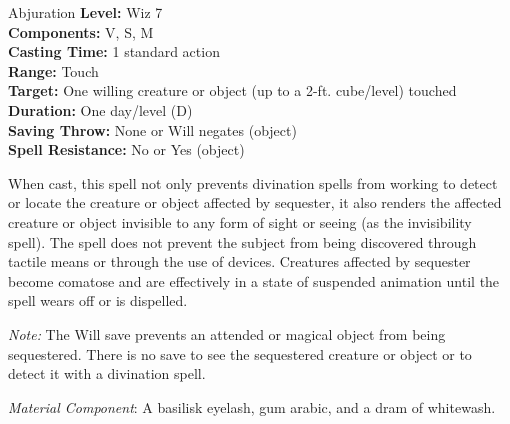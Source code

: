 {Abjuration}
{
	\textbf{Level:}
	Wiz 7\\
	\textbf{Components:}
	V, S, M\\
	\textbf{Casting Time:}
	1 standard action\\
	\textbf{Range:}
	Touch\\
	\textbf{Target:}
	One willing creature or object (up to a 2-ft. cube/level) touched\\
	\textbf{Duration:}
	One day/level (D)\\
	\textbf{Saving Throw:}
	None or Will negates (object)\\
	\textbf{Spell Resistance:}
	No or Yes (object)\\
}
{
	When cast, this spell not only prevents divination spells from working to detect or locate the creature or object affected by sequester, it also renders the affected creature or object invisible to any form of sight or seeing (as the invisibility spell). The spell does not prevent the subject from being discovered through tactile means or through the use of devices. Creatures affected by sequester become comatose and are effectively in a state of suspended animation until the spell wears off or is dispelled.

	\textit{Note:} The Will save prevents an attended or magical object from being sequestered. There is no save to see the sequestered creature or object or to detect it with a divination spell.

	\textit{Material Component}:
	A basilisk eyelash, gum arabic, and a dram of whitewash.

}
